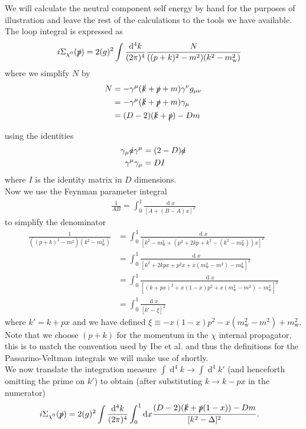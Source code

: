 \documentclass[11pt]{article}
\def\sp{\slashed{p}}
\def\sk{\slashed{k}}
\def\cn{\chi^0}
\def\gm{\gamma^{\mu}}
\def\gn{\gamma^{\nu}}
\renewcommand{\d}{\ensuremath{\operatorname{d}\!}}
\begin{document}
We will calculate the neutral component self energy by hand for the purposes of illustration and leave the rest of the calculations to the tools we have available.  The loop integral is expressed as
\begin{align}
i\Sigma_{\cn}(\slashed{p})&=2 (g)^2 \int \frac{\d^4k}{(2\pi)^4} \frac{N}{((p+k)^2-m^2)(k^2-m_{\text{w}}^2)}
\end{align}
where we simplify $N$ by
\begin{align*}
N&=-\gm(\sk+\sp+m)\gn g_{\mu\nu}\\
&=-\gm(\sk+\sp+m)\gamma_{\mu}\\
&=(D-2)(\sk+\sp)-Dm
\end{align*}

using the identities
\begin{align}
\begin{split}
\gamma_{\mu}\slashed{a}\gm&=(2-D)\slashed{a}\\
\gm\gamma_{\mu}&=DI
\end{split}
\end{align}
where $I$ is the identity matrix in $D$ dimensions.\\

Now we use the Feynman parameter integral
\begin{align}
\frac{1}{AB}=\int_0^1 \frac{\d x}{[A+(B-A)x]^2}
\end{align}
to simplify the denominator
\begin{align*}
 \frac{1}{((p+k)^2-m^2)(k^2-m_{\text{w}}^2)}&=\int_0^1\frac{\d x}{[k^2-m_{\text{w}}^2+(p^2+2kp+k^2-(k^2-m_{\text{w}}^2))x]^2}\\
&=\int_0^1\frac{\d x}{[ k^2+2kpx+p^2x+x(m_{\text{w}}^2-m^2)-m_{\text{w}}^2]^2}\\
&=\int_0^1\frac{\d x}{[ (k+px)^2+x(1-x)p^2+x(m_{\text{w}}^2-m^2)-m_{\text{w}}^2]^2}\\
&=\int_0^1\frac{\d x}{[ k'-\xi]^2}
\end{align*}
where $k'=k+px$ and we have defined $\xi\equiv-x(1-x)p^2-x(m_{\text{w}}^2-m^2)+m_{\text{w}}^2$.  Note that we choose $(p+k)$ for the momentum in the $\chi$ internal propagator, this is to match the convention used by Ibe et al. \cite{Ibe2013a} and thus the definitions for the Passarino-Veltman integrals we will make use of shortly.\\


We now translate the integration measure $\int \d^4k\rightarrow\int \d^4k'$ (and henceforth omitting the prime on $k'$) to obtain (after substituting $k\rightarrow k-px$ in the numerator)
\begin{align}
i\Sigma_{\cn}(\slashed{p})&= 2(g)^2 \int \frac{\d^4k}{(2\pi)^4}\int_0^1 \d x \frac{(D-2)(\sk+\sp(1-x) )-Dm}{[ k^2-\Delta]^2}.
\end{align}
\end{document}
